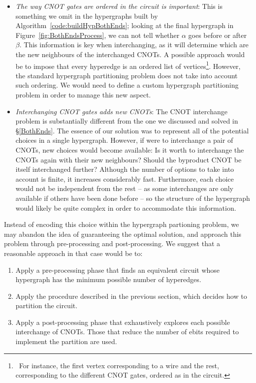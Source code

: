 \begin{itemize}
  \item \textit{The way CNOT gates are ordered in the circuit is important}: This is something we omit in the hypergraphs built by Algorithm~\ref{code:buildHypBothEnds}; looking at the final hypergraph in Figure~\ref{fig:BothEndsProcess}, we can not tell whether \(\alpha\) goes before or after \(\beta\). This information is key when interchanging, as it will determine which are the new neighbours of the interchanged CNOTs. A possible approach would be to impose that every hyperedge is an ordered list of vertices\footnote{\, For instance, the first vertex corresponding to a wire and the rest, corresponding to the different CNOT gates, ordered as in the circuit.}. However, the standard hypergraph partitioning problem does not take into account such ordering. We would need to define a custom hypergraph partitioning problem in order to manage this new aspect.

  \item \textit{Interchanging CNOT gates adds new CNOTs}: The CNOT interchange problem is substantially different from the one we discussed and solved in \S\ref{BothEnds}. The essence of our solution was to represent all of the potential choices in a single hypergraph. However, if were to interchange a pair of CNOTs, new choices would become available: Is it worth to interchange the CNOTs again with their new neighbours? Should the byproduct CNOT be itself interchanged further? Although the number of options to take into account is finite, it increases considerably fast. Furthermore, each choice would not be independent from the rest -- as some interchanges are only available if others have been done before -- so the structure of the hypergraph would likely be quite complex in order to accommodate this information.
\end{itemize}

Instead of encoding this choice within the hypergraph partioning problem, we may abandon the idea of guaranteeing the optimal solution, and approach this problem through pre-processing and post-processing. We suggest that a reasonable approach in that case would be to:
\begin{enumerate} 
\item Apply a pre-processing phase that finds an equivalent circuit whose hypergraph has the minimum possible number of hyperedges. 
\item Apply the procedure described in the previous section, which decides how to partition the circuit. 
\item Apply a post-processing phase that exhaustively explores each possible interchange of CNOTs. Those that reduce the number of ebits required to implement the partition are used.
\end{enumerate}

